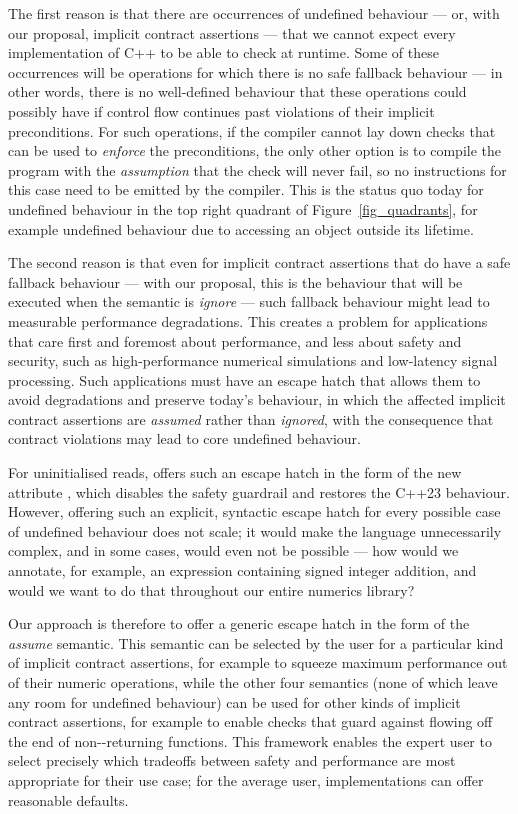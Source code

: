 The first reason is that there are occurrences of undefined behaviour --- or, with our proposal, implicit contract assertions --- that we cannot expect every implementation of C++ to be able to check at runtime. Some of these occurrences will be operations for which there is no safe fallback behaviour --- in other words, there is no well-defined behaviour that these operations could possibly have if control flow continues past violations of their implicit preconditions. For such operations, if the compiler cannot lay down checks that can be used to \emph{enforce} the preconditions, the only other option is to compile the program with the \emph{assumption} that the check will never fail, so no instructions for this case need to be emitted by the compiler. This is the status quo today for undefined behaviour in the top right quadrant of Figure~\ref{fig_quadrants}, for example undefined behaviour due to accessing an object outside its lifetime.

The second reason is that even for implicit contract assertions that do have a safe fallback behaviour --- with our proposal, this is the behaviour that will be executed when the semantic is \emph{ignore} --- such fallback behaviour might lead to measurable performance degradations. This creates a problem for applications that care first and foremost about performance, and less about safety and security, such as high-performance numerical simulations and low-latency signal processing. Such applications must have an escape hatch that allows them to avoid degradations and preserve today's behaviour, in which the affected implicit contract assertions are \emph{assumed} rather than \emph{ignored}, with the consequence that contract violations may lead to core undefined behaviour.

For uninitialised reads, \cite{P2795R5} offers such an escape hatch in the form of the new attribute \tcode{[[indeterminate]]}, which disables the safety guardrail and restores the C++23 behaviour. However, offering such an explicit, syntactic escape hatch for every possible case of undefined behaviour does not scale; it would make the language unnecessarily complex, and in some cases, would even not be possible --- how would we annotate, for example, an expression containing signed integer addition, and would we want to do that throughout our entire numerics library? 

Our approach is therefore to offer a generic escape hatch in the form of the \emph{assume} semantic. This semantic can be selected by the user for a particular kind of implicit contract assertions, for example to squeeze maximum performance out of their numeric operations, while the other four semantics (none of which leave any room for undefined behaviour) can be used for other kinds of implicit contract assertions, for example to enable checks that guard against flowing off the end of non--returning functions. This framework enables the expert user to select precisely which tradeoffs between safety and performance are most appropriate for their use case; for the average user, implementations can offer reasonable defaults.

